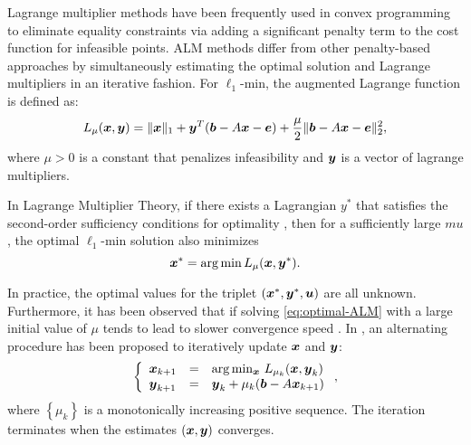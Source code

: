 \documentclass[10pt,twocolumn,letterpaper]{article}
\begin{document}
Lagrange multiplier methods have been frequently used in convex programming to eliminate equality constraints via adding a significant penalty term to the cost function for infeasible points. ALM methods differ from other penalty-based approaches by simultaneously estimating the optimal solution and Lagrange multipliers in an iterative fashion.
For $\ell_1$-min, the augmented Lagrange function is defined as:
\begin{equation}
L_\mu({\boldsymbol{x}},{\boldsymbol{y}}) = \|{\boldsymbol{x}}\|_1 + {\boldsymbol{y}}^T({\boldsymbol{b}} - A{\boldsymbol{x}} - {\boldsymbol{e}}) + \frac{\mu}{2} \| {\boldsymbol{b}}-A{\boldsymbol{x}}-{\boldsymbol{e}} \|_2^2,
\end{equation}
where $\mu > 0$ is a constant that penalizes infeasibility and ${\boldsymbol{y}}$ is a vector of lagrange multipliers.

In Lagrange Multiplier Theory, if there exists a Lagrangian $y^*$ that satisfies the second-order sufficiency conditions for optimality \cite{BertsekasD2003}, then for a sufficiently large $mu$, the optimal $\ell_1$-min solution also minimizes
\begin{equation}
{\boldsymbol{x}}^* = \arg \min L_\mu({\boldsymbol{x}},{\boldsymbol{y}}^*).
\label{eq:optimal-ALM}
\end{equation}

In practice, the optimal values for the triplet $({\boldsymbol{x}}^*, {\boldsymbol{y}}^*, {\boldsymbol{u}})$ are all unknown. Furthermore, it has been observed that if solving \eqref{eq:optimal-ALM} with a large initial value of $\mu$ tends to lead to slower convergence speed \cite{WrightS2008,YangA2010-ICIP}. In \cite{BertsekasD2003,YangJ2009}, an alternating procedure has been proposed to iteratively update ${\boldsymbol{x}}$ and ${\boldsymbol{y}}$:
\begin{equation}
\left \{
\begin{array}{lll}
{\boldsymbol{x}}_{k+1} & = & \arg\min_{{\boldsymbol{x}}} \, L_{\mu_k} ({\boldsymbol{x}},{\boldsymbol{y}}_k)\\
{\boldsymbol{y}}_{k+1} & = & {\boldsymbol{y}}_k + \mu_k ({\boldsymbol{b}} - A{\boldsymbol{x}}_{k+1}) \\
\end{array}
\right . ,
\label{eq:alm}
\end{equation}
where $\left\{\mu_{k}\right\}$ is a monotonically increasing positive sequence. The iteration terminates when the estimates $({\boldsymbol{x}}, {\boldsymbol{y}})$ converges.
\end{document}
